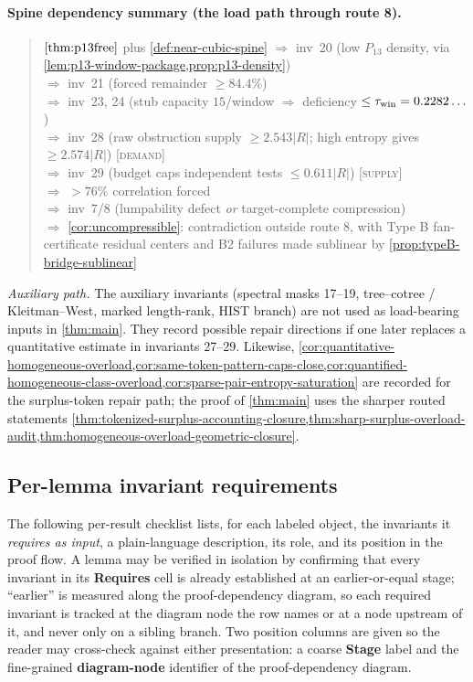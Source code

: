 \documentclass[11pt]{article}
\begin{document}
\paragraph{Spine dependency summary (the load path through route 8).}
\begin{quote}\small\raggedright
$\cref{thm:p13free}$ plus \cref{def:near-cubic-spine} $\Rightarrow$ inv~20 (low $P_{13}$ density, via \cref{lem:p13-window-package,prop:p13-density}) \\
$\Rightarrow$ inv~21 (forced remainder $\ge84.4\%$) \\
$\Rightarrow$ inv~23, 24 (stub capacity $15$/window $\Rightarrow$ deficiency $\le\tau_{\rm win}=0.2282\ldots$) \\
$\Rightarrow$ inv~28 (raw obstruction supply $\ge2.543|R|$; high entropy gives $\ge2.574|R|$) \hfill [\textsc{demand}] \\
$\Rightarrow$ inv~29 (budget caps independent tests $\le0.611|R|$) \hfill [\textsc{supply}] \\
$\Rightarrow$ $>76\%$ correlation forced \\
$\Rightarrow$ inv~7/8 (lumpability defect \emph{or} target-complete compression) \\
$\Rightarrow$ \cref{cor:uncompressible}: contradiction outside route 8, with
Type B fan-certificate residual centers and B2 failures made sublinear by
\cref{prop:typeB-bridge-sublinear}
\end{quote}
\noindent\emph{Auxiliary path.}  The auxiliary invariants (spectral masks
17--19, tree--cotree / Kleitman--West, marked length-rank, HIST branch) are not
used as load-bearing inputs in \cref{thm:main}.  They record possible repair
directions if one later replaces a quantitative estimate in invariants 27--29.
Likewise,
\cref{cor:quantitative-homogeneous-overload,cor:same-token-pattern-caps-close,cor:quantified-homogeneous-class-overload,cor:sparse-pair-entropy-saturation}
are recorded for the surplus-token repair path; the proof of
\cref{thm:main} uses the sharper routed statements
\cref{thm:tokenized-surplus-accounting-closure,thm:sharp-surplus-overload-audit,thm:homogeneous-overload-geometric-closure}.

\subsection*{Per-lemma invariant requirements}

The following per-result checklist lists, for each labeled object, the invariants it \emph{requires as input}, a plain-language description, its role, and its position in the proof flow.  A lemma may be verified in isolation by confirming that every invariant in its \textbf{Requires} cell is already established at an earlier-or-equal stage; ``earlier'' is measured along the proof-dependency diagram, so each required invariant is tracked at the diagram node the row names or at a node upstream of it, and never only on a sibling branch.  Two position columns are given so the reader may cross-check against either presentation: a coarse \textbf{Stage} label and the fine-grained \textbf{diagram-node} identifier of the proof-dependency diagram.
\end{document}

